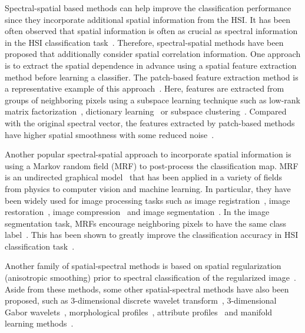\documentclass[journal]{IEEEtran}
\begin{document}
	Spectral-spatial based methods can help improve the classification performance since they incorporate additional spatial information from the HSI. It has been {{often observed}} that spatial information is often as crucial as spectral information in the HSI classification task~\cite{plaza2009recent,fauvel2013advances,tarabalka2009spectral,qian2013hyperspectral}. Therefore, spectral-spatial methods have been proposed that additionally consider spatial correlation information. One approach is to extract the spatial dependence in advance using a spatial feature extraction method before learning a classifier. The patch-based feature extraction method is a representative example of this approach~\cite{chen2011hyperspectral,chen2013hyperspectral,soltani2015spatial,sun2014structured}. Here, features are extracted from groups of neighboring pixels using a subspace learning technique such as low-rank matrix factorization~\cite{xu2015spectral}, dictionary learning~\cite{chen2011hyperspectral,
soltani2015spatial} or subspace 
	clustering~\cite{jia2015spectral}. Compared with the original spectral vector, the features extracted by patch-based methods have higher spatial smoothness with some reduced noise~\cite{cao2017integration}. 
	
	Another popular spectral-spatial approach to incorporate spatial information is using a Markov random field (MRF) to post-process the classification map. MRF is an undirected graphical model~\cite{besag1974spatial} that has been applied in a variety of fields from physics to computer vision and machine learning. In particular, they have been widely used for image processing tasks such as image registration~\cite{zikic2010linear}, image restoration~\cite{bhatt1994robust}, image compression~\cite{reyes2007lossy} and image segmentation~\cite{chen2014semantic}. In the image segmentation task, MRFs encourage neighboring pixels to have the same class label~\cite{li2010semisupervised}. This has been shown to greatly improve the classification accuracy in HSI classification task~\cite{li2012spectral,tarabalka2014graph,cao2017integration}.
	
	{{Another family of spatial-spectral methods is based on spatial regularization (anisotropic smoothing) prior to spectral classification of the regularized image~\cite{mendez2012efficiency,duarte2008multiscale}.}} Aside from these methods, some other spatial-spectral methods have also been proposed, such as 3-dimensional discrete wavelet transform~\cite{cao2017integration,qian2013hyperspectral}, 3-dimensional Gabor wavelets~\cite{shen2011three}, morphological profiles~\cite{benediktsson2005classification}, attribute profiles~\cite{dalla2011classification} and {{manifold learning methods~\cite{crawford2009manifold,ma2010local}.}}
	
\end{document}
